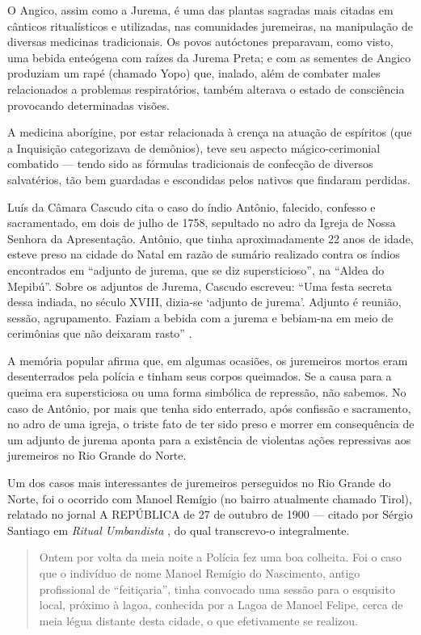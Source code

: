 \begin{refsection}
    O Angico, assim como a Jurema, é uma das plantas sagradas mais citadas em cânticos ritualísticos e utilizadas, nas comunidades juremeiras, na manipulação de diversas medicinas tradicionais. Os povos autóctones preparavam, como visto, uma bebida enteógena com raízes da Jurema Preta; e com as sementes de Angico produziam um rapé (chamado Yopo) que, inalado, além de combater males relacionados a problemas respiratórios, também alterava o estado de consciência provocando determinadas visões.  

    A medicina aborígine, por estar relacionada à crença na atuação de espíritos (que a Inquisição categorizava de demônios), teve seu aspecto mágico-cerimonial combatido --- tendo sido as fórmulas tradicionais de confecção de diversos salvatérios, tão bem guardadas e escondidas pelos nativos que findaram perdidas. 

    Luís da Câmara Cascudo cita o caso do índio Antônio, falecido, confesso e sacramentado, em dois de julho de 1758, sepultado no adro da Igreja de Nossa Senhora da Apresentação. Antônio, que tinha aproximadamente 22 anos de idade, esteve preso na cidade do Natal em razão de sumário realizado contra os índios encontrados em ``adjunto de jurema, que se diz supersticioso'', na ``Aldea do Mepibú''. Sobre os adjuntos de Jurema, Cascudo escreveu: ``Uma festa secreta dessa indiada, no século XVIII, dizia-se `adjunto de jurema'. Adjunto é reunião, sessão, agrupamento. Faziam a bebida com a jurema e bebiam-na em meio de cerimônias que não deixaram rasto'' \citeyear[p.~27--28]{Cascudo1978Melagro}. 

    A memória popular afirma que, em algumas ocasiões, os juremeiros mortos eram desenterrados pela polícia e tinham seus corpos queimados. Se a causa para a queima era supersticiosa ou uma forma simbólica de repressão, não sabemos. No caso de Antônio, por mais que tenha sido enterrado, após confissão e sacramento, no adro de uma igreja, o triste fato de ter sido preso e morrer em consequência de um adjunto de jurema aponta para a existência de violentas ações repressivas aos juremeiros no Rio Grande do Norte. 

    Um dos casos mais interessantes de juremeiros perseguidos no Rio Grande do Norte, foi o ocorrido com Manoel Remígio (no bairro atualmente chamado Tirol), relatado no jornal A REPÚBLICA de 27 de outubro de 1900 --- citado por Sérgio Santiago em \textit{Ritual Umbandista} \citeyear[p.~15--16]{Santiago1973Ritual}, do qual transcrevo-o integralmente.

    \begin{quotation}
        Ontem por volta da meia noite a Polícia fez uma boa colheita. Foi o caso que o indivíduo de nome Manoel Remígio do Nascimento, antigo profissional de ``feitiçaria'', tinha convocado uma sessão para o esquisito local, próximo à lagoa, conhecida por a Lagoa de Manoel Felipe, cerca de meia légua distante desta cidade, o que efetivamente se realizou. 


\end{quotation}
\end{refsection}
